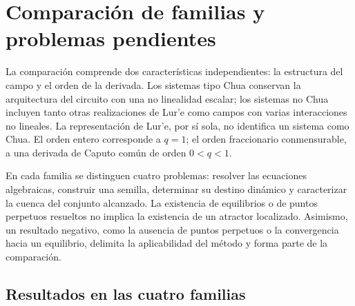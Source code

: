 \section{Comparación de familias y problemas pendientes}
\label{sec:cobertura-cuatro-familias}

La comparación comprende dos características independientes: la estructura
del campo y el orden de la derivada. Los sistemas tipo Chua conservan la
arquitectura del circuito con una no linealidad escalar; los sistemas no Chua
incluyen tanto otras realizaciones de Lur'e como campos con varias
interacciones no lineales. La representación de Lur'e, por sí sola, no
identifica un sistema como Chua. El orden entero corresponde a \(q=1\); el
orden fraccionario conmensurable, a una derivada de Caputo común de orden
\(0<q<1\).

En cada familia se distinguen cuatro problemas: resolver las ecuaciones
algebraicas, construir una semilla, determinar su destino dinámico y
caracterizar la cuenca del conjunto alcanzado. La existencia de equilibrios o
de puntos perpetuos resueltos no implica la existencia de un atractor
localizado. Asimismo, un resultado negativo, como la ausencia de puntos
perpetuos o la convergencia hacia un equilibrio, delimita la aplicabilidad
del método y forma parte de la comparación.

\subsection{Resultados en las cuatro familias}

